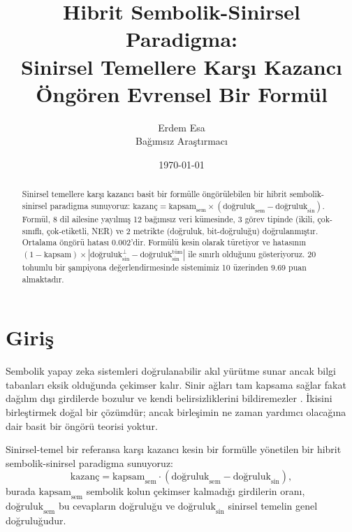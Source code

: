 \documentclass[11pt,a4paper]{article}
\title{Hibrit Sembolik-Sinirsel Paradigma:\\ Sinirsel Temellere Karşı Kazancı Öngören Evrensel Bir Formül}
\author{Erdem Esa\\ \small Bağımsız Araştırmacı}
\date{\today}
\begin{document}
\maketitle

\begin{abstract}
Sinirsel temellere karşı kazancı basit bir formülle öngörülebilen bir
hibrit sembolik-sinirsel paradigma sunuyoruz:
$\text{kazanç} = \text{kapsam}_{\text{sem}} \times
(\text{doğruluk}_{\text{sem}} - \text{doğruluk}_{\text{sin}})$.
Formül, 8 dil ailesine yayılmış 12 bağımsız veri kümesinde, 3 görev
tipinde (ikili, çok-sınıflı, çok-etiketli, NER) ve 2 metrikte (doğruluk,
bit-doğruluğu) doğrulanmıştır. Ortalama öngörü hatası 0.002'dir.
Formülü kesin olarak türetiyor ve hatasının
$(1-\text{kapsam}) \times |\text{doğruluk}_{\text{sin}}^{\perp} -
\text{doğruluk}_{\text{sin}}^{\text{tüm}}|$ ile sınırlı olduğunu
gösteriyoruz. 20 tohumlu bir şampiyona değerlendirmesinde sistemimiz
10 üzerinden 9.69 puan almaktadır.
\end{abstract}

\section{Giriş}
\label{sec:giris}
Sembolik yapay zeka sistemleri doğrulanabilir akıl yürütme sunar
\cite{garcez2023neurosymbolic,manhaeve2018deepproblog} ancak bilgi
tabanları eksik olduğunda çekimser kalır. Sinir ağları tam kapsama
sağlar \cite{vaswani2017attention} fakat dağılım dışı girdilerde
bozulur ve kendi belirsizliklerini bildiremezler
\cite{marcus2020next,bengio2021hybrid}. İkisini birleştirmek doğal bir
çözümdür; ancak birleşimin ne zaman yardımcı olacağına dair basit bir
öngörü teorisi yoktur.

Sinirsel-temel bir referansa karşı kazancı kesin bir formülle yönetilen
bir hibrit sembolik-sinirsel paradigma sunuyoruz:
\begin{equation}
\label{eq:main}
\text{kazanç} = \text{kapsam}_{\text{sem}} \cdot
(\text{doğruluk}_{\text{sem}} - \text{doğruluk}_{\text{sin}}),
\end{equation}
burada $\text{kapsam}_{\text{sem}}$ sembolik kolun çekimser kalmadığı
girdilerin oranı, $\text{doğruluk}_{\text{sem}}$ bu cevapların
doğruluğu ve $\text{doğruluk}_{\text{sin}}$ sinirsel temelin genel
doğruluğudur.
\end{document}
